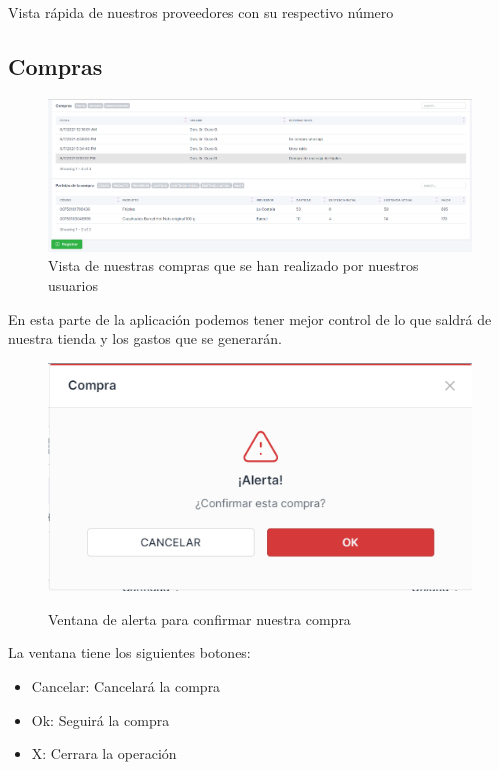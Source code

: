 \documentclass[a4paper,DIV=12]{scrreprt}
\begin{document}
	Vista rápida de nuestros proveedores con su respectivo número\\

\subsection{Compras}

	\begin{figure}[!htb]
		\centering
		\includegraphics[scale=0.4]{COMPRAS.PNG}
		\caption{Vista de nuestras compras que se han realizado por nuestros usuarios}
	\end{figure}
	 En esta parte de la aplicación podemos tener mejor control de lo que saldrá de nuestra tienda y los gastos que se generarán.\\
		\begin{figure}[!htb]
		\centering
		\includegraphics[scale=0.4]{CONFIRMAR.PNG}\\
		\caption{Ventana de alerta para confirmar nuestra compra}
	\end{figure}
	La ventana tiene los siguientes botones:\\
	\begin{itemize}
	
\item Cancelar: Cancelará la compra
\item Ok: Seguirá la compra
\item X: Cerrara la operación
\end{itemize}
\end{document}

